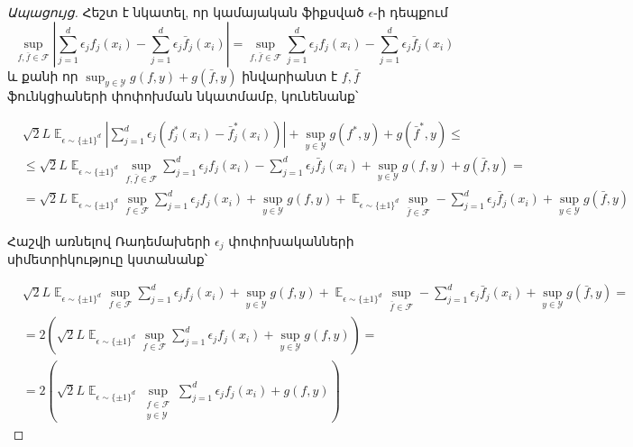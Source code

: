 \documentclass[11pt]{article}
\DeclareMathOperator*{\E}{\mathbb{E}}
\begin{document}
\begin{proof}[Ապացույց]
Հեշտ է նկատել, որ կամայական ֆիքսված $\epsilon$-ի դեպքում 
$$\sup_{f, \bar{f} \in \mathcal{F}}      \left |  \sum_{j=1}^d \epsilon_j f_j(x_i) - \sum_{j=1}^d \epsilon_j\bar{f}_j(x_i)  \right|  = 
\sup_{f, \bar{f} \in \mathcal{F}}         \sum_{j=1}^d \epsilon_j f_j(x_i) - \sum_{j=1}^d \epsilon_j\bar{f}_j(x_i)    $$
և քանի որ $\sup_{y \in \mathcal{Y}}    g(f, y) + g(\bar{f}, y)$ ինվարիանտ է $f, \bar{f}$ ֆունկցիաների փոփոխման նկատմամբ, կունենանք՝ 

\begin{align*}
&  {\sqrt{2}L} \E_{\epsilon \sim \{\pm 1\}^d}    \left |  \sum_{j=1}^d \epsilon_j (f^*_j(x_i) - \bar{f}_j^*(x_i))  \right|                    + \sup_{y \in \mathcal{Y}}    g(f^*, y) + g(\bar{f}^*, y)  \leq \\
&\leq  {\sqrt{2}L} \E_{\epsilon \sim \{\pm 1\}^d}        \sup_{f, \bar{f} \in \mathcal{F}}        \sum_{j=1}^d \epsilon_j f_j(x_i) - \sum_{j=1}^d \epsilon_j\bar{f}_j(x_i)                      + \sup_{y \in \mathcal{Y}}    g(f, y) + g(\bar{f}, y)  = \\
&=  {\sqrt{2}L} \E_{\epsilon \sim \{\pm 1\}^d}        \sup_{f \in \mathcal{F}}        \sum_{j=1}^d \epsilon_j f_j(x_i)    + \sup_{y \in \mathcal{Y}}    g(f, y)    +  \E_{\epsilon \sim \{\pm 1\}^d}        \sup_{\bar{f} \in \mathcal{F}}   -  \sum_{j=1}^d \epsilon_j\bar{f}_j(x_i)                      + \sup_{y \in \mathcal{Y}}  g(\bar{f}, y) 
\end{align*}


Հաշվի առնելով Ռադեմախերի $\epsilon_j$ փոփոխականների սիմետրիկություը կստանանք՝

\begin{align*}
&{\sqrt{2}L} \E_{\epsilon \sim \{\pm 1\}^d}        \sup_{f \in \mathcal{F}}        \sum_{j=1}^d \epsilon_j f_j(x_i)    + \sup_{y \in \mathcal{Y}}    g(f, y)    +  \E_{\epsilon \sim \{\pm 1\}^d}        \sup_{\bar{f} \in \mathcal{F}}   -  \sum_{j=1}^d \epsilon_j\bar{f}_j(x_i)                      + \sup_{y \in \mathcal{Y}}  g(\bar{f}, y)  = \\
&= 2\left({\sqrt{2}L} \E_{\epsilon \sim \{\pm 1\}^d}        \sup_{f \in \mathcal{F}}        \sum_{j=1}^d \epsilon_j f_j(x_i)    + \sup_{y \in \mathcal{Y}}    g(f, y)  \right)    = \\
&=  2\left({\sqrt{2}L} \E_{\epsilon \sim \{\pm 1\}^d}        \sup_{\substack{f \in \mathcal{F}  \\ y \in \mathcal{Y}  }}     \sum_{j=1}^d \epsilon_j f_j(x_i)    +   g(f, y)  \right)    
\end{align*}


\end{proof}
\end{document}
